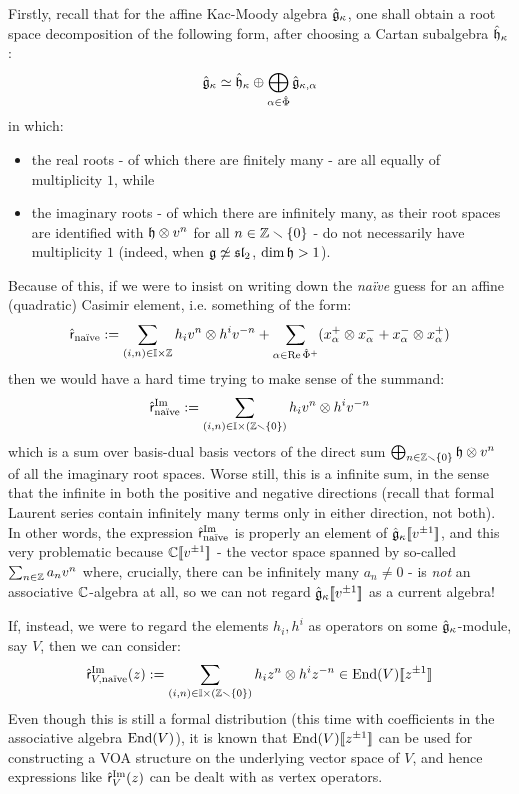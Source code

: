         Firstly, recall that for the affine Kac-Moody algebra $\hat{\mathfrak{g}}_{\kappa}$, one shall obtain a root space decomposition of the following form, after choosing a Cartan subalgebra $\hat{\mathfrak{h}}_{\kappa}$:
            $$\hat{\mathfrak{g}}_{\kappa} \simeq \hat{\mathfrak{h}}_{\kappa} \oplus \bigoplus_{\alpha \in \hat{\Phi}} \hat{\mathfrak{g}}_{\kappa, \alpha}$$
        in which:
        \begin{itemize}
            \item the real roots - of which there are finitely many - are all equally of multiplicity $1$, while
            \item the imaginary roots - of which there are infinitely many, as their root spaces are identified with $\h \tensor v^n$ for all $n \in \mathbb{Z} \smallsetminus \{0\}$ - do not necessarily have multiplicity $1$ (indeed, when $\mathfrak{g} \not \simeq \mathfrak{sl}_2$, $\dim \mathfrak{h} > 1$).
        \end{itemize}
        Because of this, if we were to insist on writing down the \textit{na\"ive} guess for an affine (quadratic) Casimir element, i.e. something of the form:
            $$\hat{\sfr}_{\text{na\"ive}} := \sum_{(i, n) \in \simpleroots \x \Z} h_i v^n \tensor h^i v^{-n} + \sum_{\alpha \in \Re \hat{\Phi}^+} (x_{\alpha}^+ \tensor x_{\alpha}^- + x_{\alpha}^- \tensor x_{\alpha}^+)$$
        then we would have a hard time trying to make sense of the summand:
            $$\hat{\sfr}_{\text{na\"ive}}^{\Im} := \sum_{(i, n) \in \simpleroots \x (\Z \setminus \{0\})} h_i v^n \tensor h^i v^{-n}$$
        which is a sum over basis-dual basis vectors of the direct sum $\bigoplus_{n \in \Z \setminus \{0\}} \h \tensor v^n$ of all the imaginary root spaces. Worse still, this is a  infinite sum, in the sense that the infinite in both the positive and negative directions (recall that formal Laurent series contain infinitely many terms only in either direction, not both). In other words, the expression $\hat{\mathsf{r}}_{\text{na\"ive}}^{\operatorname{Im}}$ is properly an element of $\hat{\mathfrak{g}}_{\kappa}[\![v^{\pm 1}]\!]$, and this very problematic because $\mathbb{C}[\![v^{\pm 1}]\!]$ - the vector space spanned by so-called  $\sum_{n \in \mathbb{Z}} a_n v^n$ where, crucially, there can be infinitely many $a_n \not = 0$ - is \textit{not} an associative $\mathbb{C}$-algebra at all, so we can not regard $\hat{\mathfrak{g}}_{\kappa}[\![v^{\pm 1}]\!]$ as a current algebra!

        If, instead, we were to regard the elements $h_i, h^i$ as operators on some $\hat{\mathfrak{g}}_{\kappa}$-module, say $V$, then we can consider:
            $$\hat{\sfr}_{V, \text{na\"ive}}^{\Im}(z) := \sum_{(i, n) \in \simpleroots \x (\Z \setminus \{0\})} h_i z^n \tensor h^i z^{-n} \in \End(V)[\![z^{\pm 1}]\!]$$
        Even though this is still a formal distribution (this time with coefficients in the associative algebra $\mathrm{End}(V)$), it is known that $\mathrm{End}(V)[\![z^{\pm 1}]\!]$ can be used for constructing a VOA structure on the underlying vector space of $V$, and hence expressions like $\hat{\mathsf{r}}_V^{\operatorname{Im}}(z)$ can be dealt with as vertex operators.

